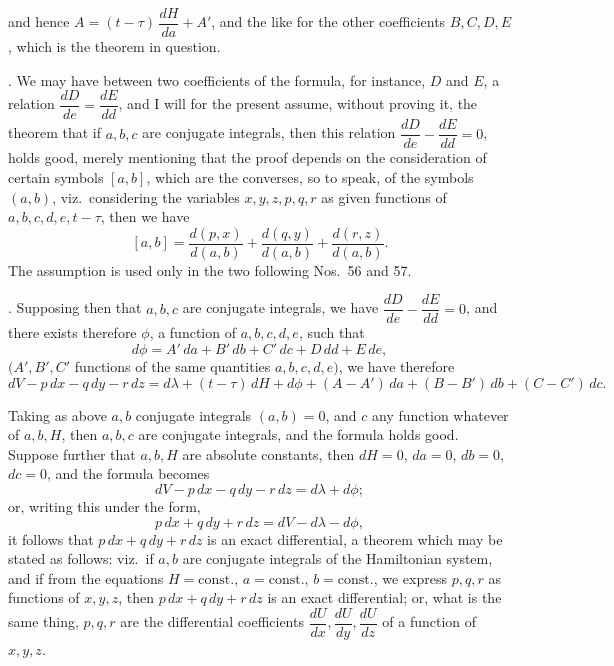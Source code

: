 \documentclass[11pt,a4paper]{article}
\begin{document}
\newpage


and hence $A = (t - \tau)\,\dfrac{dH}{da} + A'$, and the like for the other coefficients $B, C, D, E$, which is the theorem in question.

\medskip

. We may have between two coefficients of the formula, for instance, $D$ and $E$, a relation $\dfrac{dD}{de} = \dfrac{dE}{dd}$, and I will for the present assume, without proving it, the theorem that if $a, b, c$ are conjugate integrals, then this relation $\dfrac{dD}{de} - \dfrac{dE}{dd} = 0$, holds good, merely mentioning that the proof depends on the consideration of certain symbols $[a, b]$, which are the converses, so to speak, of the symbols $(a, b)$, viz.\ considering the variables $x, y, z, p, q, r$ as given functions of $a, b, c, d, e, t - \tau$, then we have
\[
[a, b] = \frac{d(p, x)}{d(a, b)} + \frac{d(q, y)}{d(a, b)} + \frac{d(r, z)}{d(a, b)}.
\]
The assumption is used only in the two following Nos.\ 56 and 57.

\medskip

. Supposing then that $a, b, c$ are conjugate integrals, we have $\dfrac{dD}{de} - \dfrac{dE}{dd} = 0$, and there exists therefore $\phi$, a function of $a, b, c, d, e$, such that
\[
d\phi = A'\,da + B'\,db + C'\,dc + D\,dd + E\,de,
\]
$(A', B', C'$ functions of the same quantities $a, b, c, d, e)$, we have therefore
\[
dV - p\,dx - q\,dy - r\,dz = d\lambda + (t - \tau)\,dH + d\phi + (A - A')\,da + (B - B')\,db + (C - C')\,dc.
\]

Taking as above $a, b$ conjugate integrals $(a, b) = 0$, and $c$ any function whatever of $a, b, H$, then $a, b, c$ are conjugate integrals, and the formula holds good. Suppose further that $a, b, H$ are absolute constants, then $dH = 0$, $da = 0$, $db = 0$, $dc = 0$, and the formula becomes
\[
dV - p\,dx - q\,dy - r\,dz = d\lambda + d\phi;
\]
or, writing this under the form,
\[
p\,dx + q\,dy + r\,dz = dV - d\lambda - d\phi,
\]
it follows that $p\,dx + q\,dy + r\,dz$ is an exact differential, a theorem which may be stated as follows: viz.\ if $a, b$ are conjugate integrals of the Hamiltonian system, and if from the equations $H = \text{const.}$, $a = \text{const.}$, $b = \text{const.}$, we express $p, q, r$ as functions of $x, y, z$, then $p\,dx + q\,dy + r\,dz$ is an exact differential; or, what is the same thing, $p, q, r$ are the differential coefficients $\dfrac{dU}{dx}, \dfrac{dU}{dy}, \dfrac{dU}{dz}$ of a function of $x, y, z$.
\end{document}
